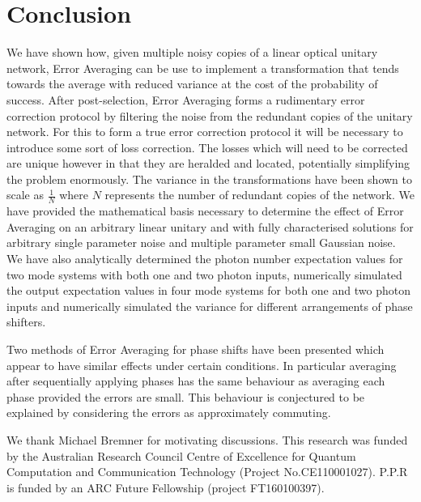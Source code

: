 \documentclass[aps,pra,twocolumn,superscriptaddress,numerical,floatfix]{revtex4-1}
\begin{document}
\section{Conclusion\label{Conclusion}}

We have shown how, given multiple noisy copies of a linear optical unitary network, Error Averaging can be use to implement a transformation that tends towards the average with reduced variance at the cost of the probability of success.  After post-selection, Error Averaging forms a rudimentary error correction protocol by filtering the noise from the redundant copies of the unitary network. For this to form a true error correction protocol it will be necessary to introduce some sort of loss correction. The losses which will need to be corrected are unique however in that they are heralded and located, potentially simplifying the problem enormously. The variance in the transformations have been shown to scale as $\frac{1}{N}$ where $N$ represents the number of redundant copies of the network.  We have provided the mathematical basis necessary to determine the effect of Error Averaging on an arbitrary linear unitary and with fully characterised solutions for arbitrary single parameter noise and multiple parameter small Gaussian noise. We have also analytically determined the photon number expectation values for two mode systems with both one and two photon inputs, numerically simulated the output expectation values in four mode systems for both one and two photon inputs and numerically simulated the variance for different arrangements of phase shifters.

Two methods of Error Averaging for phase shifts have been presented which appear to have similar effects under certain conditions. In particular averaging after sequentially applying phases has the same behaviour as averaging each phase provided the errors are small. This behaviour is conjectured to be explained by considering the errors as approximately commuting.

\begin{acknowledgments}
	We thank Michael Bremner for motivating discussions. This research was funded by the Australian Research Council Centre of Excellence for Quantum Computation and Communication Technology (Project No.CE110001027). P.P.R is funded by an ARC Future Fellowship (project FT160100397).
\end{acknowledgments}


\end{document}
